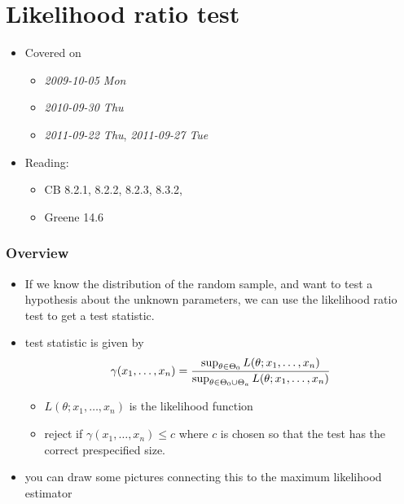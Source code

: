 
\part{Likelihood ratio test}

\begin{itemize}
\item Covered on
\begin{itemize}
\item \textit{2009-10-05 Mon}
\item \textit{2010-09-30 Thu}
\item \textit{2011-09-22 Thu}, \textit{2011-09-27 Tue}
\end{itemize}
\item Reading:
\begin{itemize}
\item CB 8.2.1, 8.2.2, 8.2.3, 8.3.2,
\item Greene 14.6
\end{itemize}
\end{itemize}
\section{Overview}
\label{sec-1}

\begin{itemize}
\item If we know the distribution of the random sample, and want to
      test a hypothesis about the unknown parameters, we can use the
      likelihood ratio test to get a test statistic.
\item test statistic is given by
      \[\gamma(x_1,\dots,x_n) = {\sup_{\theta \in \Theta_0} L(\theta;
      x_1,\dots,x_n) \over \sup_{\theta \in \Theta_0 \cup \Theta_a} L(\theta;
      x_1,\dots,x_n)}\]
\begin{itemize}
\item $L(\theta; x_1,\dots,x_n)$ is the likelihood function
\item reject if $\gamma(x_1,\dots,x_n) \leq c$ where $c$ is chosen
        so that the test has the correct prespecified size.
\end{itemize}
\item you can draw some pictures connecting this to the maximum
      likelihood estimator
\end{itemize}
